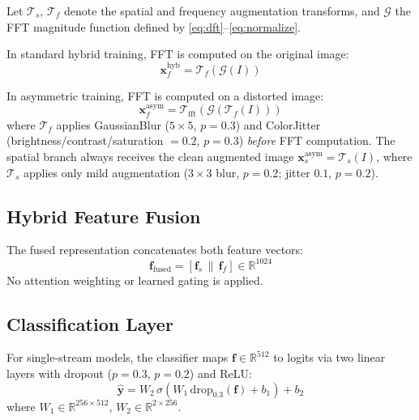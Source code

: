 \documentclass[conference]{IEEEtran}
\begin{document}
Let $\mathcal{T}_s$, $\mathcal{T}_f$ denote the spatial and frequency
augmentation transforms, and $\mathcal{G}$ the FFT magnitude function
defined by \eqref{eq:dft}--\eqref{eq:normalize}.

In standard hybrid training, FFT is computed on the original image:
\begin{equation}
  \mathbf{x}_f^{\mathrm{hyb}} = \mathcal{T}_f\!\left(
  \mathcal{G}(I)\right)
  \label{eq:hybrid_input}
\end{equation}

In asymmetric training, FFT is computed on a distorted image:
\begin{equation}
  \mathbf{x}_f^{\mathrm{asym}} = \mathcal{T}_{\mathrm{fft}}\!\left(
  \mathcal{G}\!\left(\mathcal{T}_f(I)\right)\right)
  \label{eq:asym_input}
\end{equation}
where $\mathcal{T}_f$ applies GaussianBlur ($5{\times}5$, $p{=}0.3$)
and ColorJitter (brightness/contrast/saturation $=0.2$, $p{=}0.3$)
\emph{before} FFT computation. The spatial branch always receives the
clean augmented image $\mathbf{x}_s^{\mathrm{asym}} = \mathcal{T}_s(I)$,
where $\mathcal{T}_s$ applies only mild augmentation
($3{\times}3$ blur, $p{=}0.2$; jitter $0.1$, $p{=}0.2$).

\subsection{Hybrid Feature Fusion}

The fused representation concatenates both feature vectors:
\begin{equation}
  \mathbf{f}_{\mathrm{fused}} = \left[\mathbf{f}_s \,\|\,
  \mathbf{f}_f\right] \in \mathbb{R}^{1024}
  \label{eq:fusion}
\end{equation}
No attention weighting or learned gating is applied.

\subsection{Classification Layer}

For single-stream models, the classifier maps $\mathbf{f} \in
\mathbb{R}^{512}$ to logits via two linear layers with dropout
($p{=}0.3$, $p{=}0.2$) and ReLU:
\begin{equation}
  \hat{\mathbf{y}} = W_2\,\sigma\!\left(
  W_1\,\mathrm{drop}_{0.3}(\mathbf{f}) + b_1\right) + b_2
  \label{eq:classifier_single}
\end{equation}
where $W_1 \in \mathbb{R}^{256 \times 512}$,
$W_2 \in \mathbb{R}^{2 \times 256}$.
\end{document}

